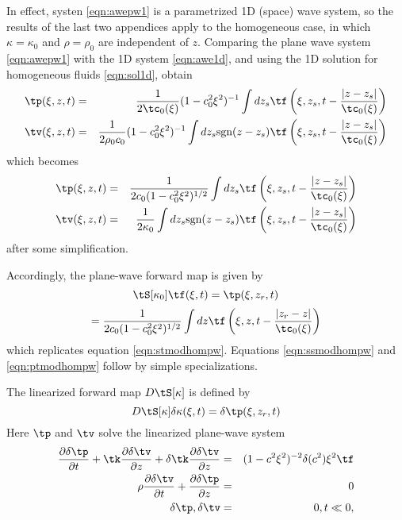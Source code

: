 In effect, systen \ref{eqn:awepw1} is a parametrized 1D (space) wave
system, so the results of the last two appendices apply to the
homogeneous case, in which $\kappa=\kappa_0$ and $\rho=\rho_0$ are
independent of $z$. Comparing the plane wave system \ref{eqn:awepw1} with the 1D system
\ref{eqn:awe1d}, and using the 1D solution for homogeneous fluids
\ref{eqn:sol1d}, obtain
\begin{eqnarray*}
\tp(\xi,z,t) &=& \frac{1}{2\tc_0(\xi)}(1-c_0^2\xi^2)^{-1}\int dz_s
                 \tf\left(\xi,z_s,t -
                 \frac{|z-z_s|}{\tc_0(\xi)}\right) \nonumber \\
\tv(\xi,z,t) &=& \frac{1}{2\rho_0 c_0}(1-c_0^2\xi^2)^{-1} \int dz_s \mbox{sgn} (z-z_s)\tf\left(\xi,z_s,t - \frac{|z-z_s|}{\tc_0(\xi)}\right)
           \nonumber \\
\end{eqnarray*}
which becomes
\begin{eqnarray}
\label{eqn:solpw}
 \tp(\xi,z,t)   &=&\frac{1}{2c_0(1-c_0^2\xi^2)^{1/2}}\int dz_s 
                 \tf\left(\xi,z_s,t -
                 \frac{|z-z_s|}{\tc_0(\xi)}\right) \nonumber \\
\tv(\xi,z,t) &=& \frac{1}{2\kappa_0} \int dz_s \mbox{sgn} (z-z_s)\tf\left(\xi,z_s,t - \frac{|z-z_s|}{\tc_0(\xi)}\right)
                 \nonumber \\
\end{eqnarray}
after some simplification.

Accordingly, the plane-wave forward map is given by
\[
  \tS[\kappa_0]\tf(\xi,t) =\tp(\xi,z_r,t)
\]
\begin{equation}
\label{eqn:fwdpw1}
= \frac{1}{2c_0(1-c_0^2\xi^2)^{1/2}}\int dz \tf\left(\xi,z,t -
  \frac{|z_r-z|}{\tc_0(\xi)}\right)
\end{equation}
which replicates equation \ref{eqn:stmodhompw}. Equations
\ref{eqn:ssmodhompw} and \ref{eqn:ptmodhompw} follow by simple specializations.

The linearized forward map $D\tS[\kappa]$ is defined by
\begin{equation}
  \label{eqn:dfwdpw}
  D\tS[\kappa]\delta \kappa(\xi,t) = \delta \tp(\xi,z_r,t)
\end{equation}
Here $\tp$ and $\tv$ solve the linearized plane-wave system
\begin{eqnarray}
\label{eqn:dawepw1}
\frac{\partial \delta\tp}{\partial t} + \tk\frac{\partial
  \delta \tv}{\partial z} +  \delta \tk\frac{\partial
  \delta \tv}{\partial z}  &=& (1-c^2\xi^2)^{-2}\delta (c^2)\xi^2\tf \nonumber\\
\rho \frac{\partial \delta \tv}{\partial t} + \frac{\partial \delta \tp}{\partial
  z}&=&0\nonumber\\
\delta \tp,\delta \tv&=&0, t \ll 0,
\end{eqnarray}

